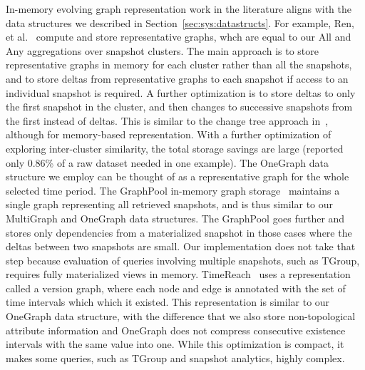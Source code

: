 In-memory evolving graph representation work in the literature aligns
with the data structures we described in
Section~\ref{sec:sys:datastructs}.  For example, Ren, et
al.~\cite{Ren2011} compute and store representative graphs, whch are
equal to our All and Any aggregations over snapshot clusters.  The
main approach is to store representative graphs in memory for each
cluster rather than all the snapshots, and to store deltas from
representative graphs to each snapshot if access to an individual
snapshot is required.  A further optimization is to store deltas to
only the first snapshot in the cluster, and then changes to successive
snapshots from the first instead of deltas.  This is similar to the
change tree approach in~\cite{Khurana2013}, although for memory-based
representation.  With a further optimization of exploring
inter-cluster similarity, the total storage savings are large
(reported only 0.86\% of a raw dataset needed in one example).  The
OneGraph data structure we employ can be thought of as a
representative graph for the whole selected time period.  The
GraphPool in-memory graph storage~\cite{Khurana2013} maintains a
single graph representing all retrieved snapshots, and is thus similar
to our MultiGraph and OneGraph data structures.  The GraphPool goes
further and stores only dependencies from a materialized snapshot in
those cases where the deltas between two snapshots are small.  Our
implementation does not take that step because evaluation of queries
involving multiple snapshots, such as TGroup, requires fully
materialized views in memory.  TimeReach~\cite{Semertzidis2015} uses a
representation called a version graph, where each node and edge is
annotated with the set of time intervals which which it existed.  This
representation is similar to our OneGraph data structure, with the
difference that we also store non-topological attribute information
and OneGraph does not compress consecutive existence intervals with
the same value into one.  While this optimization is compact, it makes
some queries, such as TGroup and snapshot analytics, highly complex.



